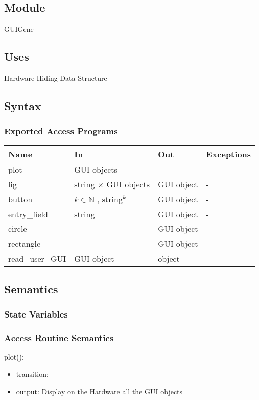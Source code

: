 \documentclass[12pt, titlepage]{article}
\begin{document}
\subsection{Module}
GUIGene
\subsection{Uses}
Hardware-Hiding
Data Structure
\subsection{Syntax}

\subsubsection{Exported Access Programs}

\begin{center}
\begin{tabular}{p{2cm} p{4cm} p{4cm} p{2cm}}
\hline
\textbf{Name} & \textbf{In} & \textbf{Out} & \textbf{Exceptions} \\
\hline
plot & GUI objects & - & - \\
fig & string $\times$ GUI objects &  GUI object & - \\
button & $k \in \mathbb{N}$ , {string}$^{k}$ &  GUI object & - \\
entry{\_}field & string &  GUI object & - \\
circle & - &  GUI object & - \\
rectangle & - & GUI object & - \\
read{\_}user{\_}GUI & GUI object & object \\
\hline
\end{tabular}
\end{center}

\subsection{Semantics}

\subsubsection{State Variables}


\subsubsection{Access Routine Semantics}

\noindent plot():
\begin{itemize}
\item transition:
\item output: Display on the Hardware all the GUI objects 
\end{itemize}
\end{document}
